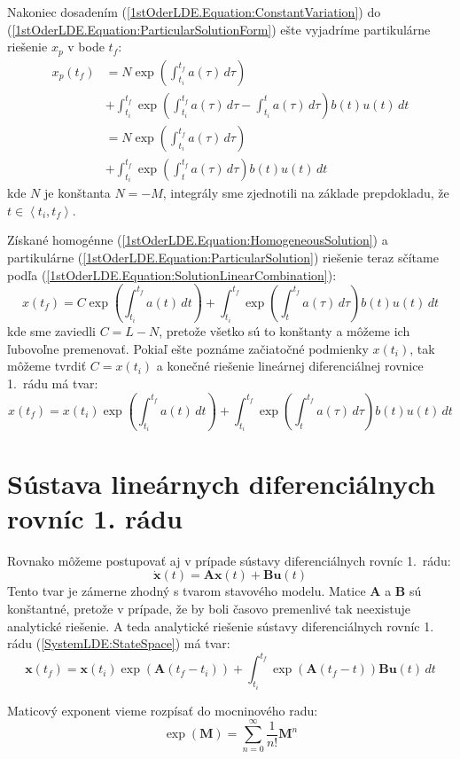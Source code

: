 \documentclass[a4paper, 10pt, ]{article}
\begin{document}
\noindent Nakoniec dosadením (\ref{1stOderLDE.Equation:ConstantVariation}) do (\ref{1stOderLDE.Equation:ParticularSolutionForm}) ešte vyjadríme partikulárne riešenie $x_p$ v bode $t_f$:
\begin{align}
    \label{1stOderLDE.Equation:ParticularSolution}
    \nonumber
    x_p(t_f) &= 
    N \exp \left( \int_{t_i}^{t_f} a(\tau) \, d\tau \right) \\ &+ 
    \int_{t_i}^{t_f} \exp \left( \int_{t_i}^{t_f} a(\tau) \, d\tau - \int_{t_i}^{t} a(\tau) \, d\tau \right) b(t) u(t) \, dt \\ &= 
    N \exp \left( \int_{t_i}^{t_f} a(\tau) \, d\tau \right) \\ &+ 
    \int_{t_i}^{t_f} \exp \left( \int_{t}^{t_f} a(\tau) \, d\tau \right) b(t) u(t) \, dt
\end{align}
kde $N$ je konštanta $N = -M$, integrály sme zjednotili na základe prepdokladu, že $t \in \left< t_i, t_f \right>$.

Získané homogénne (\ref{1stOderLDE.Equation:HomogeneousSolution}) a partikulárne (\ref{1stOderLDE.Equation:ParticularSolution}) riešenie teraz sčítame podľa (\ref{1stOderLDE.Equation:SolutionLinearCombination}):
\begin{equation}
    x(t_f) = 
    C \exp \left( \int_{t_i}^{t_f} a(t) \, dt \right) + 
    \int_{t_i}^{t_f} \exp \left( \int_{t}^{t_f} a(\tau) \, d\tau \right) b(t) u(t) \, dt
\end{equation}
kde sme zaviedli $C = L - N$, pretože všetko sú to konštanty a môžeme ich ľubovoľne premenovať. Pokiaľ ešte poznáme začiatočné podmienky $x(t_i)$, tak môžeme tvrdiť $C = x(t_i)$ a konečné riešenie lineárnej diferenciálnej rovnice 1.~rádu má tvar:
\begin{equation}
    x(t_f) = 
    x(t_i) \exp \left( \int_{t_i}^{t_f} a(t) \, dt \right) + 
    \int_{t_i}^{t_f} \exp \left( \int_{t}^{t_f} a(\tau) \, d\tau \right) b(t) u(t) \, dt 
\end{equation}



\section{Sústava lineárnych diferenciálnych rovníc 1. rádu}

Rovnako môžeme postupovať aj v prípade sústavy diferenciálnych rovníc 1.~rádu:
\begin{equation}
    \label{SystemLDE:StateSpace}
    \dot{\bm{x}}(t) = \bm{A} \bm{x}(t) + \bm{B} \bm{u}(t)
\end{equation}
Tento tvar je zámerne zhodný s tvarom stavového modelu. Matice $\bm{A}$ a $\bm{B}$ sú konštantné, pretože v prípade, že by boli časovo premenlivé tak neexistuje analytické riešenie. A teda analytické riešenie sústavy diferenciálnych rovníc 1. rádu (\ref{SystemLDE:StateSpace}) má tvar:
\begin{equation}
    \bm{x}(t_f) = 
    \bm{x}(t_i) \exp \left( \bm{A} (t_f - t_i) \right) + 
    \int_{t_i}^{t_f} \exp \left( \bm{A} (t_f - t) \right) \bm{B} \bm{u}(t) \, dt 
\end{equation}

Maticový exponent vieme rozpísať do mocninového radu:
\begin{equation}
    \exp(\bm{M}) = \sum_{n = 0}^{\infty} \frac{1}{n!}\bm{M}^n
\end{equation}
\end{document}
